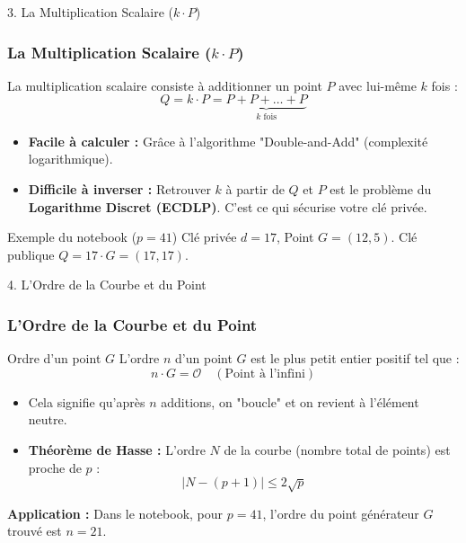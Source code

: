 \begin{frame}{3. La Multiplication Scalaire ($k \cdot P$)}
\frametitle{La Multiplication Scalaire ($k \cdot P$)}

La multiplication scalaire consiste à additionner un point $P$ avec lui-même $k$ fois :
$$Q = k \cdot P = \underbrace{P + P + \dots + P}_{k \text{ fois}}$$

\begin{itemize}
    \item \textbf{Facile à calculer :} Grâce à l'algorithme "Double-and-Add" (complexité logarithmique).
    \item \textbf{Difficile à inverser :} Retrouver $k$ à partir de $Q$ et $P$ est le problème du \textbf{Logarithme Discret (ECDLP)}. C'est ce qui sécurise votre clé privée.
\end{itemize}

\begin{block}{Exemple du notebook ($p=41$)}
Clé privée $d=17$, Point $G=(12, 5)$.
Clé publique $Q = 17 \cdot G = (17, 17)$.
\end{block}
\end{frame}

\begin{frame}{4. L'Ordre de la Courbe et du Point}
\frametitle{L'Ordre de la Courbe et du Point}

\begin{block}{Ordre d'un point $G$}
L'ordre $n$ d'un point $G$ est le plus petit entier positif tel que :
$$n \cdot G = \mathcal{O} \quad (\text{Point à l'infini})$$
\end{block}

\begin{itemize}
    \item Cela signifie qu'après $n$ additions, on "boucle" et on revient à l'élément neutre.
    \item \textbf{Théorème de Hasse :} L'ordre $N$ de la courbe (nombre total de points) est proche de $p$ :
    $$|N - (p+1)| \le 2\sqrt{p}$$
\end{itemize}

\textbf{Application :} Dans le notebook, pour $p=41$, l'ordre du point générateur $G$ trouvé est $n=21$.
\end{frame}

